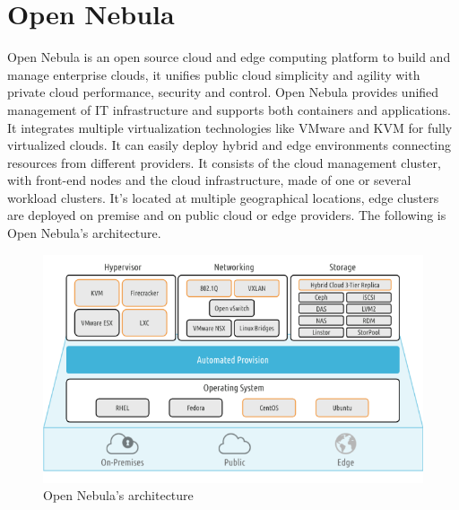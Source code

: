 \section{Open Nebula}
Open Nebula is an open source cloud and edge computing platform to build and manage enterprise clouds, it unifies public cloud simplicity and agility with private cloud performance, security and control. \n
Open Nebula provides unified management of IT infrastructure and supports both containers and applications. It integrates multiple virtualization technologies like VMware and KVM for fully virtualized clouds. It can easily deploy hybrid and edge environments connecting resources from different providers. \n
It consists of the cloud management cluster, with front-end nodes and the cloud infrastructure, made of one or several workload clusters. It's located at multiple geographical locations, edge clusters are deployed on premise and on public cloud or edge providers. The following is Open Nebula's architecture.
\begin{figure}
    \centering
    \includegraphics[scale=0.6]{img/Open_Nebula.png}
    \caption{Open Nebula's architecture}
\end{figure}
